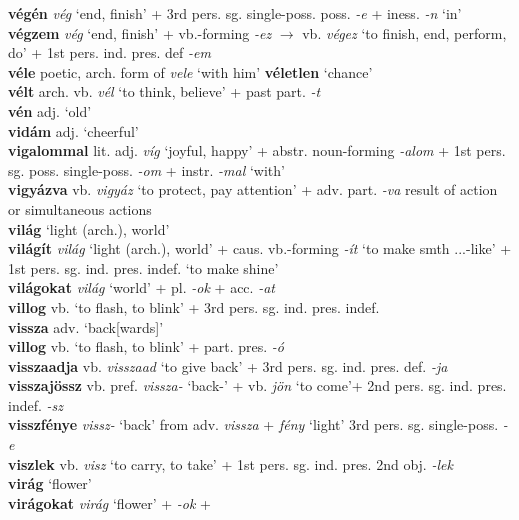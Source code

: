 \documentclass[11pt]{article}
\begin{document}
\textbf{végén} \emph{vég} `end, finish' + 3rd
pers. sg. single\hyp{}poss. poss. \emph{-e} + iness. \emph{-n} `in' \\
\textbf{végzem} \emph{vég} `end, finish' + vb.\hyp{}forming \emph{-ez}
$\rightarrow$ vb. \emph{végez} `to finish, end, perform, do' + 1st
pers. ind. pres. def \emph{-em} \\
\textbf{véle} poetic, arch. form of \emph{vele} `with him'
\textbf{véletlen} `chance' \\
\textbf{vélt} arch. vb. \emph{vél} `to think, believe' + past
part. \emph{-t} \\
\textbf{vén} adj. `old' \\
\textbf{vidám} adj. `cheerful' \\
\textbf{vigalommal} lit. adj. \emph{víg} `joyful, happy' +
abstr. noun\hyp{}forming \emph{-alom} + 1st
pers. sg. poss. single\hyp{}poss. \emph{-om} + instr. \emph{-mal} `with'  \\
\textbf{vigyázva} vb. \emph{vigyáz} `to protect, pay attention' +
  adv. part. \emph{-va} result of action or simultaneous actions \\
\textbf{világ} `light (arch.), world' \\
\textbf{világít} \emph{világ} `light (arch.), world' +
caus. vb.-forming \emph{-ít} `to make smth ...-like' + 1st
pers. sg. ind. pres. indef. `to make shine' \\
\textbf{világokat} \emph{világ} `world' + pl. \emph{-ok} +
acc. \emph{-at} \\
\textbf{villog} vb. `to flash, to blink' + 3rd
pers. sg. ind. pres. indef. \\
\textbf{vissza} adv. `back[wards]' \\
\textbf{villog} vb. `to flash, to blink'  + part. pres. \emph{-ó} \\
\textbf{visszaadja} vb. \emph{visszaad} `to give back' + 3rd
  pers. sg. ind. pres. def. \emph{-ja} \\
\textbf{visszajössz} vb. pref. \emph{vissza-} `back-' + vb. \emph{jön}
  `to come'+ 2nd pers. sg. ind. pres. indef. \emph{-sz} \\
\textbf{visszfénye} \emph{vissz-} `back' from adv. \emph{vissza}
+ \emph{fény} `light' 3rd
pers. sg. single\hyp{}poss. \emph{-e} \\
\textbf{viszlek} vb. \emph{visz} `to carry, to take' + 1st
pers. sg. ind. pres. 2nd obj. \emph{-lek} \\
\textbf{virág} `flower' \\
\textbf{virágokat} \emph{virág} `flower' + \emph{-ok} +
\end{document}
